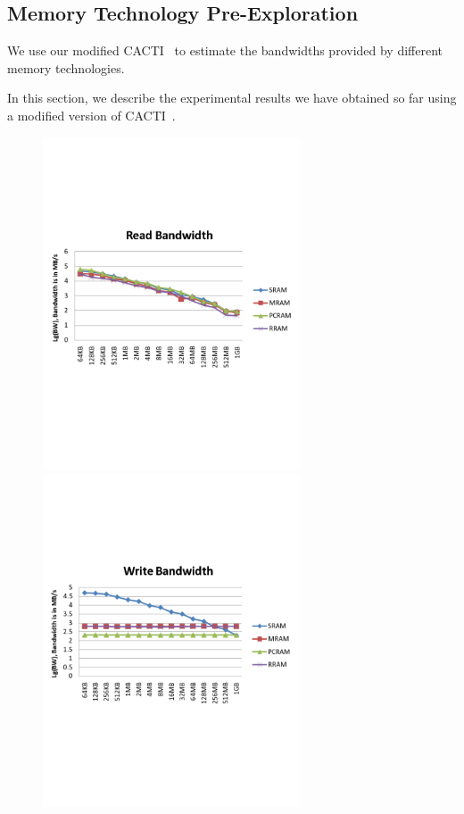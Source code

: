 \documentclass[10pt,letterpaper,singlecolumn]{article}
\begin{document}
\begin{large}
\section{Memory Technology Pre-Exploration}

We use our modified CACTI~\cite{CACTI} to estimate the bandwidths provided
by different memory technologies.

In this section, we describe the experimental results we have obtained so far
using a modified version of CACTI~\cite{CACTI}. \vspace{-0.5in}

\begin{figure}[htbp]
\centering
\includegraphics[width=3in]{figures/read-bw}
\includegraphics[width=3in]{figures/write-bw}\\


\end{figure}
\end{large}
\end{document}
